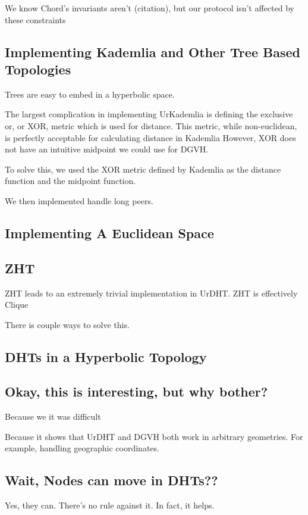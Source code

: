 \documentclass[11pt,conference]{IEEEtran}
\begin{document}
	We know Chord's invariants aren't (citation), but our protocol isn't affected by these constraints
	
	
	\subsection{Implementing Kademlia and Other Tree Based Topologies}
	Trees are easy to embed in a hyperbolic space.
	
	The largest complication in implementing UrKademlia is defining the exclusive or, or XOR, metric which is used for distance.
	This metric, while non-euclidean, is perfectly acceptable for calculating distance in Kademlia \cite{kademlia}
	However, XOR does not have an intuitive midpoint we could use for DGVH.
	
	To solve this, we used the XOR metric defined by Kademlia as the distance function and the midpoint function.
	
	
	We then implemented handle long peers.
	
	\subsection{Implementing A Euclidean Space}
	
	
	\subsection{ZHT}
	ZHT \cite{li2013zht} leads to an extremely trivial implementation in UrDHT.
	ZHT is effectively Clique
	
	There is couple ways to solve this.
	
	\subsection{DHTs in a Hyperbolic Topology}
	
	\label{sec:hyper}
	

	
	
	
	\subsection{Okay, this is interesting, but why bother?}
	Because we it was difficult
	
	Because it shows that UrDHT and DGVH both work in arbitrary geometries.
	For example, handling geographic coordinates. 
	
	
	\subsection{Wait, Nodes can move in DHTs??}
	Yes, they can.  
	There's no rule against it. 
	In fact, it helps.
	
\end{document}
